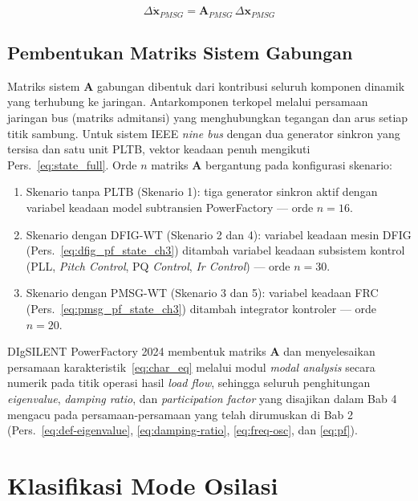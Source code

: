 \begin{equation}
    \Delta\dot{\mathbf{x}}_{PMSG} = \mathbf{A}_{PMSG}\,\Delta\mathbf{x}_{PMSG}
    \label{eq:pmsg_linear_ch3}
\end{equation}

\subsection{Pembentukan Matriks Sistem Gabungan}

Matriks sistem $\mathbf{A}$ gabungan dibentuk dari kontribusi seluruh komponen
dinamik yang terhubung ke jaringan. Antarkomponen terkopel melalui persamaan
jaringan bus (matriks admitansi) yang menghubungkan tegangan dan arus setiap
titik sambung. Untuk sistem IEEE \textit{nine bus} dengan dua generator sinkron
yang tersisa dan satu unit PLTB, vektor keadaan penuh mengikuti
Pers.~\eqref{eq:state_full}. Orde $n$ matriks $\mathbf{A}$ bergantung pada
konfigurasi skenario:

\begin{enumerate}
    \item Skenario tanpa PLTB (Skenario 1): tiga generator sinkron aktif dengan
    variabel keadaan model subtransien PowerFactory --- orde $n = 16$.
    \item Skenario dengan DFIG-WT (Skenario 2 dan 4): variabel keadaan mesin
    DFIG (Pers.~\eqref{eq:dfig_pf_state_ch3}) ditambah variabel keadaan
    subsistem kontrol (PLL, \textit{Pitch Control}, PQ \textit{Control},
    \textit{Ir Control}) --- orde $n = 30$.
    \item Skenario dengan PMSG-WT (Skenario 3 dan 5): variabel keadaan FRC
    (Pers.~\eqref{eq:pmsg_pf_state_ch3}) ditambah integrator kontroler ---
    orde $n = 20$.
\end{enumerate}

DIgSILENT PowerFactory 2024 membentuk matriks $\mathbf{A}$ dan menyelesaikan
persamaan karakteristik~\eqref{eq:char_eq} melalui modul \textit{modal
analysis} secara numerik pada titik operasi hasil \textit{load flow}, sehingga
seluruh penghitungan \textit{eigenvalue}, \textit{damping ratio}, dan
\textit{participation factor} yang disajikan dalam Bab 4 mengacu pada
persamaan-persamaan yang telah dirumuskan di Bab 2 (Pers.~\ref{eq:def-eigenvalue},
\ref{eq:damping-ratio}, \ref{eq:freq-osc}, dan \ref{eq:pf}).

\section{Klasifikasi Mode Osilasi}

